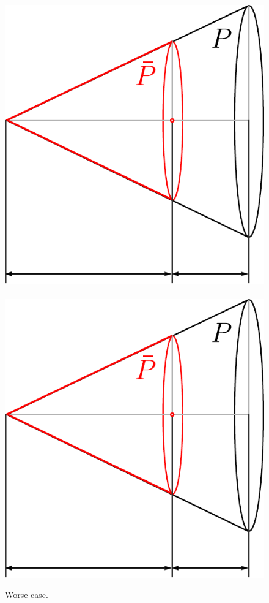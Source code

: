 \begin{figure} 
\begin{centering}
\includegraphics[scale=0.65]{cutting/cog_worstcase.pdf}
$\qquad\qquad$
\includegraphics[scale=0.65]{cutting/cog_worstcase.pdf}
\par\end{centering}
\caption{Worse case.} \label{fig:worst-case}
\end{figure}

